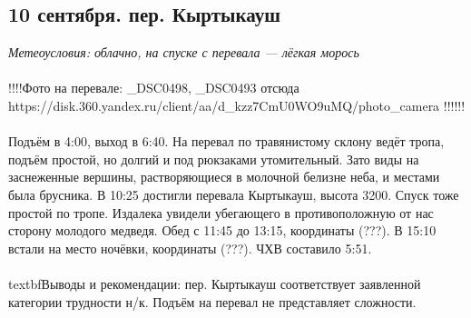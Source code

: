 \subsection{10 сентября. пер. Кыртыкауш}
\textit{Метеоусловия: облачно, на спуске с перевала — лёгкая морось}
\\\\
!!!!Фото на перевале: _DSC0498, _DSC0493 отсюда https://disk.360.yandex.ru/client/aa/d_kzz7CmU0WO9uMQ/photo_camera !!!!!!\\\\
Подъём в 4:00, выход в 6:40. На перевал по травянистому склону ведёт тропа, подъём простой, но долгий и под рюкзаками утомительный. Зато виды на заснеженные вершины, растворяющиеся в молочной белизне неба, и местами была брусника. В 10:25 достигли перевала Кыртыкауш, высота 3200. Спуск тоже простой по тропе. Издалека увидели убегающего в противоположную от нас сторону молодого медведя. Обед с 11:45 до 13:15, координаты (???). В 15:10 встали на место ночёвки, координаты (???). ЧХВ составило 5:51.
\\\\
textbf{Выводы и рекомендации:} пер. Кыртыкауш соответствует заявленной категории трудности н/к.  Подъём на перевал не представляет сложности. 






\clearpage
